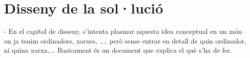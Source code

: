 \section{Disseny de la sol·lució}

        - En el capitol de disseny, s'intenta plasmar
        aquesta idea conceptual en un món on ja tenim
        ordinadors, xarxes, .... però sense entrar en
        detall de quin ordinador, ni quina xarxa,...
        Basicament és un document que explica el què s'ha
        de fer.
